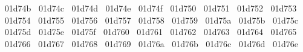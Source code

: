 {  ^^^^^^01d74b%
  ^^^^^^01d74c%
  ^^^^^^01d74d%
  ^^^^^^01d74e%
  ^^^^^^01d74f%
  ^^^^^^01d750%
  ^^^^^^01d751%
  ^^^^^^01d752%
  ^^^^^^01d753%
  ^^^^^^01d754%
  ^^^^^^01d755%
  ^^^^^^01d756%
  ^^^^^^01d757%
  ^^^^^^01d758%
  ^^^^^^01d759%
  ^^^^^^01d75a%
  ^^^^^^01d75b%
  ^^^^^^01d75c%
  ^^^^^^01d75d%
  ^^^^^^01d75e%
  ^^^^^^01d75f%
  ^^^^^^01d760%
  ^^^^^^01d761%
  ^^^^^^01d762%
  ^^^^^^01d763%
  ^^^^^^01d764%
  ^^^^^^01d765%
  ^^^^^^01d766%
  ^^^^^^01d767%
  ^^^^^^01d768%
  ^^^^^^01d769%
  ^^^^^^01d76a%
  ^^^^^^01d76b%
  ^^^^^^01d76c%
  ^^^^^^01d76d%
  ^^^^^^01d76e%
}
